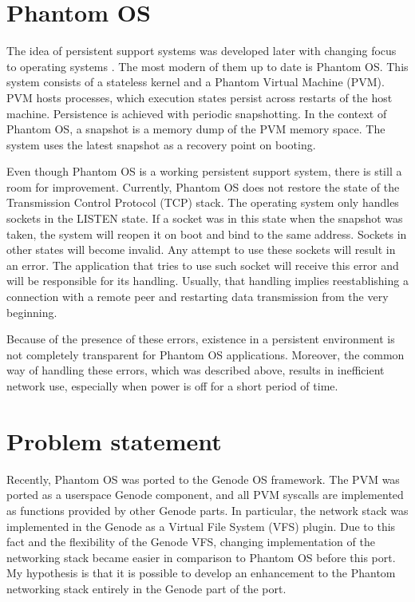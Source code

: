 \section{Phantom OS}

The idea of persistent support systems was developed later with changing focus
to operating systems \cite{landau1992checkpoint,dearle1994grasshopper}. The
most modern of them up to date is Phantom OS. This system consists of a
stateless kernel and a Phantom Virtual Machine (PVM). PVM hosts processes,
which execution states persist across restarts of the host machine. Persistence
is achieved with periodic snapshotting. In the context of Phantom OS, a
snapshot is a memory dump of the PVM memory space. The system uses the latest
snapshot as a recovery point on booting.

Even though Phantom OS is a working persistent support system, there is still a
room for improvement. Currently, Phantom OS does not restore the state of the
Transmission Control Protocol (TCP) stack. The operating system only handles
sockets in the LISTEN state. If a socket was in this state when the snapshot
was taken, the system will reopen it on boot and bind to the same address.
Sockets in other states will become invalid. Any attempt to use these sockets
will result in an error. The application that tries to use such socket will
receive this error and will be responsible for its handling. Usually, that
handling implies reestablishing a connection with a remote peer and restarting
data transmission from the very beginning.

Because of the presence of these errors, existence in a persistent environment
is not completely transparent for Phantom OS applications. Moreover, the common
way of handling these errors, which was described above, results in inefficient
network use, especially when power is off for a short period of time.

\section{Problem statement}

Recently, Phantom OS was ported to the Genode OS framework. The PVM was ported
as a userspace Genode component, and all PVM syscalls are implemented as
functions provided by other Genode parts. In particular, the network stack was
implemented in the Genode as a Virtual File System (VFS) plugin. Due to this
fact and the flexibility of the Genode VFS, changing implementation of the
networking stack became easier in comparison to Phantom OS before this port. My
hypothesis is that it is possible to develop an enhancement to the Phantom
networking stack entirely in the Genode part of the port.

